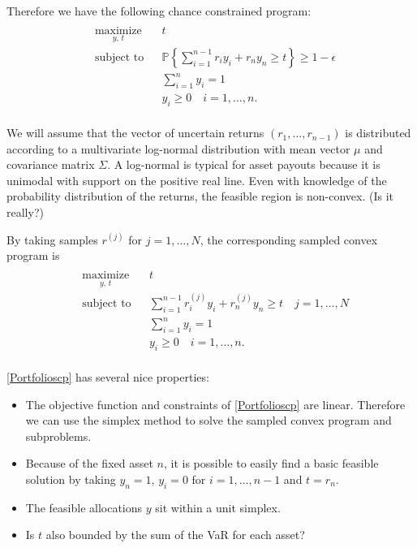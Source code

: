 \documentclass[12pt]{article}
\begin{document}
Therefore we have the following chance constrained program:
\begin{align}\label{Portfolioccp}
\begin{split}
\begin{aligned}
    & \underset{y, \,t}{\text{maximize}}
    & & t \\
    & \text{subject to}
    & & \mathbb{P}\left\{ \sum_{i=1}^{n-1} r_i y_i + r_n y_n \geq t \right\} \geq 1-\epsilon \\
    & & & \sum_{i=1}^n y_i = 1 \\
    & & & y_i \geq 0 \quad i = 1, \ldots, n.
\end{aligned}
\end{split} \tag{Portfolio CCP}
\end{align}

We will assume that the vector of uncertain returns $(r_1, \ldots, r_{n-1})$ is distributed according to a multivariate log-normal distribution with mean vector $\mu$ and covariance matrix $\Sigma$.
A log-normal is typical for asset payouts because it is unimodal with support on the positive real line.
Even with knowledge of the probability distribution of the returns, the feasible region is non-convex. (Is it really?)

By taking samples $r^{(j)}$ for $j = 1, \ldots, N$, the corresponding sampled convex program is 
\begin{align}\label{Portfolioscp}
\begin{split}
\begin{aligned}
    & \underset{y, \,t}{\text{maximize}}
    & & t \\
    & \text{subject to}
    & & \sum_{i=1}^{n-1} r_i^{(j)} y_i + r_n^{(j)} y_n \geq t \quad j = 1, \ldots, N \\
    & & & \sum_{i=1}^n y_i = 1 \\
    & & & y_i \geq 0 \quad i = 1, \ldots, n.
\end{aligned}
\end{split} \tag{Portfolio SCP$_N$}
\end{align}


\ref{Portfolioscp} has several nice properties:
\begin{itemize}
\item The objective function and constraints of \ref{Portfolioscp} are linear. Therefore we can use the simplex method to solve the sampled convex program and subproblems.
\item Because of the fixed asset $n$, it is possible to easily find a basic feasible solution by taking $y_n = 1$, $y_i = 0$ for $i = 1, \ldots, n-1$ and $t = r_n$.
\item The feasible allocations $y$ sit within a unit simplex.
\item Is $t$ also bounded by the sum of the VaR for each asset?
\end{itemize}
\end{document}
